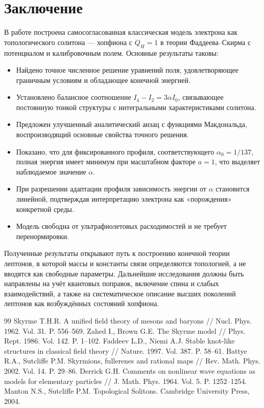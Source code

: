 \documentclass[12pt]{article}
\begin{document}
\section{Заключение}
В работе построена самосогласованная классическая модель электрона как топологического солитона --- хопфиона с $Q_H=1$ в теории Фаддеева--Скирма с потенциалом и калибровочным полем. Основные результаты таковы:
\begin{itemize}
\item Найдено точное численное решение уравнений поля, удовлетворяющее граничным условиям и обладающее конечной энергией.
\item Установлено балансное соотношение $I_4 - I_2 = 3\alpha I_0$, связывающее постоянную тонкой структуры с интегральными характеристиками солитона.
\item Предложен улучшенный аналитический анзац с функциями Макдональда, воспроизводящий основные свойства точного решения.
\item Показано, что для фиксированного профиля, соответствующего $\alpha_0=1/137$, полная энергия имеет минимум при масштабном факторе $a=1$, что выделяет наблюдаемое значение $\alpha$.
\item При разрешении адаптации профиля зависимость энергии от $\alpha$ становится линейной, подтверждая интерпретацию электрона как «порождения» конкретной среды.
\item Модель свободна от ультрафиолетовых расходимостей и не требует перенормировки.
\end{itemize}
Полученные результаты открывают путь к построению конечной теории лептонов, в которой массы и константы связи определяются топологией, а не вводятся как свободные параметры. Дальнейшие исследования должны быть направлены на учёт квантовых поправок, включение спина и слабых взаимодействий, а также на систематическое описание высших поколений лептонов как возбуждённых состояний хопфиона.

\begin{thebibliography}{99}
 Skyrme T.H.R. A unified field theory of mesons and baryons // Nucl. Phys. 1962. Vol. 31. P. 556--569.
 Zahed I., Brown G.E. The Skyrme model // Phys. Rept. 1986. Vol. 142. P. 1--102.
 Faddeev L.D., Niemi A.J. Stable knot-like structures in classical field theory // Nature. 1997. Vol. 387. P. 58--61.
 Battye R.A., Sutcliffe P.M. Skyrmions, fullerenes and rational maps // Rev. Math. Phys. 2002. Vol. 14. P. 29--86.
 Derrick G.H. Comments on nonlinear wave equations as models for elementary particles // J. Math. Phys. 1964. Vol. 5. P. 1252--1254.
 Manton N.S., Sutcliffe P.M. Topological Solitons. Cambridge University Press, 2004.
\end{thebibliography}
\end{document}
